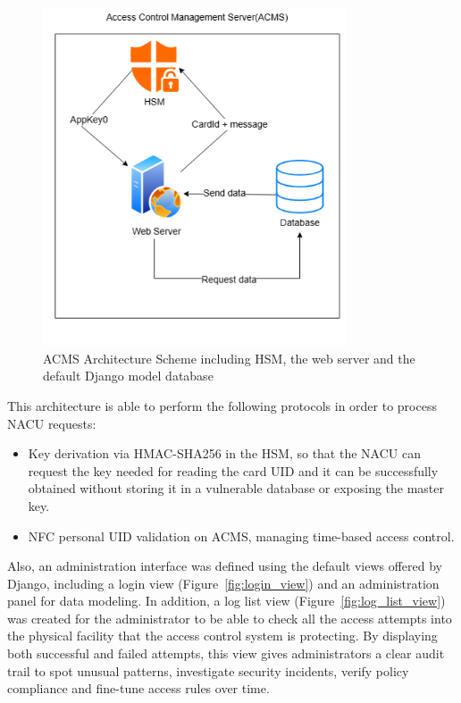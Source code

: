 \begin{figure}[h]
	\centering
	\includegraphics[width=0.8\textwidth]{imaxes/ACMS} %
	\caption{ACMS Architecture Scheme including HSM, the web server and the default Django model database}
	\label{fig:acms_architecture}
\end{figure}

This architecture is able to perform the following protocols in order to process NACU requests:
\begin{itemize}
	\item Key derivation via HMAC-SHA256 in the HSM, so that the NACU can request the key needed for reading the card UID and it can be successfully obtained without storing it in a vulnerable database or exposing the master key.
	\item NFC personal UID validation on ACMS, managing time-based access control.
\end{itemize}

Also, an administration interface was defined using the default views offered by Django, including a login view (Figure~\ref{fig:login_view}) and an administration panel for data modeling. In addition, a log list view (Figure~\ref{fig:log_list_view}) was created for the administrator to be able to check all the access attempts into the physical facility that the access control system is protecting. By displaying both successful and failed attempts, this view gives administrators a clear audit trail to spot unusual patterns, investigate security incidents, verify policy compliance and fine-tune access rules over time.

